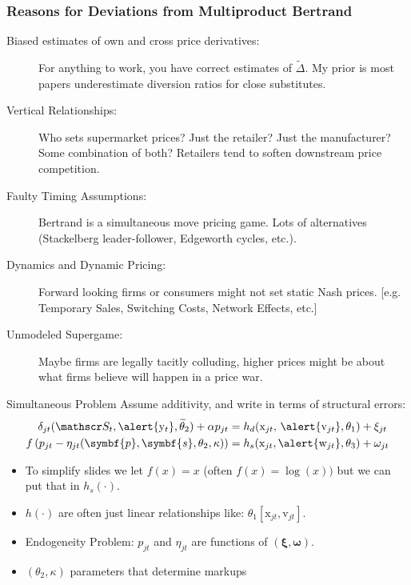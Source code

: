 \documentclass[aspectratio=169,10pt]{beamer}
\begin{document}
\begin{frame}
\frametitle{Reasons for Deviations from Multiproduct Bertrand}
\small
\begin{description}
\item[Biased estimates of own and cross price derivatives:] For anything to work, you have correct estimates of $\tilde{\Delta}$. My prior is most papers \alert{underestimate} diversion ratios for close substitutes.
\item[Vertical Relationships:] Who sets supermarket prices? Just the retailer? Just the manufacturer? Some combination of both? Retailers tend to \alert{soften} downstream price competition.
\item[Faulty Timing Assumptions:] Bertrand is a simultaneous move pricing game. Lots of alternatives (Stackelberg leader-follower, Edgeworth cycles, etc.).
\item[Dynamics and Dynamic Pricing:] Forward looking firms or consumers might not set static Nash prices. [e.g. Temporary Sales, Switching Costs, Network Effects, etc.]
\item[Unmodeled Supergame:] Maybe firms are legally tacitly colluding, higher prices might be about what firms believe will happen in a price war.
\end{description}
\end{frame}


\begin{frame}{Simultaneous Problem}
Assume additivity, and write in terms of structural errors:
\begin{align*}
\delta_{jt}(\calS_t,\alert{\mathrm{y}_t}, \widetilde{\theta}_2) + \alpha p_{jt} &= h_d(\textrm{x}_{jt}, \, \alert{\textrm{v}_{jt}},\theta_1)  + \xi_{jt} \\
 f \left( p_{jt} - \eta_{jt}(\symbf{p},\symbf{s},\theta_2,\kappa) \right) &= h_s(\textrm{x}_{jt}, \alert{\textrm{w}_{jt}},\theta_3) + \omega_{jt}
\end{align*}
\vspace{-.4cm}
\begin{itemize}
 \item To simplify slides we let $f(x)=x$ (often $f(x) =\log(x))$ but we can put that in $h_s(\cdot)$.
\item $h(\cdot)$ are often just linear relationships like: $\theta_1 [\textrm{x}_{jt}, \textrm{v}_{jt}]$.
\item Endogeneity Problem: $p_{jt}$ and $\eta_{jt}$ are functions of $(\symbf{\xi},\symbf{\omega})$.
\item $(\theta_2, \kappa)$ parameters that determine markups
\end{itemize}
\end{frame}
\end{document}
